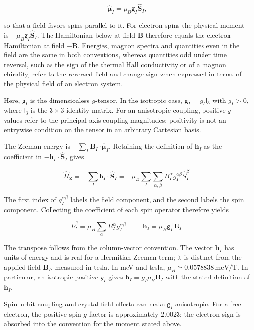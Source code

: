 \[
\hat{\boldsymbol\mu}_I=\mu_B\mathsf g_I\hat{\mathbf S}_I,
\]

so that a field favors spins parallel to it. For electron spins the physical moment is \(-\mu_B\mathsf g_I\hat{\mathbf S}_I\). The Hamiltonian below at field \(\mathbf B\) therefore equals the electron Hamiltonian at field \(-\mathbf B\). Energies, magnon spectra and quantities even in the field are the same in both conventions, whereas quantities odd under time reversal, such as the sign of the thermal Hall conductivity or of a magnon chirality, refer to the reversed field and change sign when expressed in terms of the physical field of an electron system.

Here, \(\mathsf g_I\) is the dimensionless \(g\)-tensor. In the isotropic case, \(\mathsf g_I=g_I\mathsf I_3\) with \(g_I>0\), where \(\mathsf I_3\) is the \(3\times3\) identity matrix. For an anisotropic coupling, positive \(g\) values refer to the principal-axis coupling magnitudes; positivity is not an entrywise condition on the tensor in an arbitrary Cartesian basis.

The Zeeman energy is \(-\sum_I\mathbf B_I\mathbin{\cdot}\hat{\boldsymbol\mu}_I\). Retaining the definition of \(\mathbf h_I\) as the coefficient in \(-\mathbf h_I\mathbin{\cdot}\hat{\mathbf S}_I\) gives

\begin{equation}\label{eq-lswt-zeeman-g-tensor}
\hat H_{\mathrm Z}
=-\sum_I\mathbf h_I\mathbin{\cdot}\hat{\mathbf S}_I
=-\mu_B
\sum_I
\sum_{\alpha,\beta}
B_I^\alpha g_I^{\alpha\beta}\hat{S}_I^\beta.
\end{equation}

The first index of \(g_I^{\alpha\beta}\) labels the field component, and the second labels the spin component. Collecting the coefficient of each spin operator therefore yields

\[
h_I^\beta=\mu_B\sum_\alpha B_I^\alpha g_I^{\alpha\beta},
\qquad
\mathbf h_I=\mu_B\mathsf g_I^{\mathsf T}\mathbf B_I.
\]

The transpose follows from the column-vector convention. The vector \(\mathbf h_I\) has units of energy and is real for a Hermitian Zeeman term; it is distinct from the applied field \(\mathbf B_I\), measured in tesla. In meV and tesla, \(\mu_B\simeq0.0578838\,\mathrm{meV/T}\). In particular, an isotropic positive \(g_I\) gives \(\mathbf h_I=g_I\mu_B\mathbf B_I\) with the stated definition of \(\mathbf h_I\).

Spin--orbit coupling and crystal-field effects can make \(\mathsf g_I\) anisotropic. For a free electron, the positive spin \(g\)-factor is approximately \(2.0023\); the electron sign is absorbed into the convention for the moment stated above.

